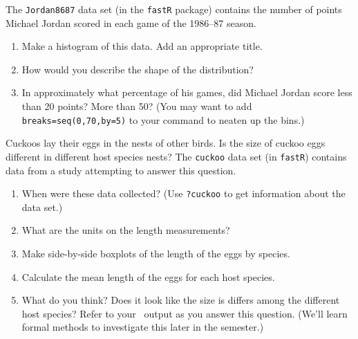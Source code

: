 \begin{knitrout}
\end{knitrout}


\begin{problem}
The \verb!Jordan8687! data set (in the \verb!fastR! package) contains the number 
of points Michael Jordan scored in each game of the 1986--87 season.  
\begin{enumerate}
\item
Make a histogram of this data.  Add an appropriate title.
\item
How would you describe the shape of the distribution?
\item
In approximately what percentage of his games, did Michael Jordan score less than 20 points?
More than 50?
(You may want to add \verb!breaks=seq(0,70,by=5)! to your command to neaten up
the bins.)
\end{enumerate}
\end{problem}

\begin{problem}
Cuckoos lay their eggs in the nests of other birds.  Is the size of cuckoo eggs different
in different host species nests?  The \verb!cuckoo! data set (in \verb!fastR!)
contains data from a study attempting to answer this question.
\begin{enumerate}
\item
When were these data collected?  (Use \verb!?cuckoo! to get information about the data set.)
\item
What are the units on the length measurements?
\item
Make side-by-side boxplots of the length of the eggs by species.
\item
Calculate the mean length of the eggs for each host species.
\item
What do you think?  Does it look like the size is differs among the different host
species?  Refer to your \R\ output as you answer this question.
(We'll learn formal methods to investigate this later in the semester.)
\end{enumerate}
\vspace{-5mm}
\end{problem}

